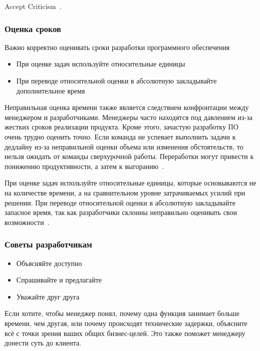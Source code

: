 \documentclass[]{../industrial-development}
\begin{document}
\lecturenotes

Accept Criticism~\cite[с.~251--252]{Stellman}.

\begin{frame} \frametitle{Оценка сроков} 
\begin{block}{}
Важно корректно оценивать сроки разработки программного обеспечения
\end{block}
\begin{itemize}
\item При оценке задач используйте относительные единицы
\item При переводе относительной оценки в абсолютную закладывайте дополнительное время
\end{itemize}
\end{frame}

\lecturenotes

Неправильная оценка времени также является следствием конфронтации между менеджером и разработчиками. Менеджеры часто находятся под давлением из-за жестких сроков реализации продукта. Кроме этого, зачастую разработку ПО очень трудно оценить точно. Если команда не успевает выполнить задачи к дедлайну из-за неправильной оценки объема или изменения обстоятельств, то нельзя ожидать от команды сверхурочной работы. Переработки могут привести к понижению продуктивности, а затем к выгоранию~\cite{Netology}.

При оценке задач используйте относительные единицы, которые основываются не на количестве времени, а на сравнительном уровне затрачиваемых усилий при решении. При переводе относительной оценки в абсолютную закладывайте запасное время, так как разработчики склонны неправильно оценивать свои возможности~\cite{Codementor}. 

\begin{frame} \frametitle{Советы разработчикам} 
\begin{itemize}
\item Объясняйте доступно
\item Спрашивайте и предлагайте
\item Уважайте друг друга
\end{itemize}
\end{frame}

\lecturenotes

Если хотите, чтобы менеджер понял, почему одна функция занимает больше времени, чем другая, или почему происходят технические задержки, объясните всё с точки зрения ваших общих бизнес-целей. Это также поможет менеджеру донести суть до клиента.
\end{document}
